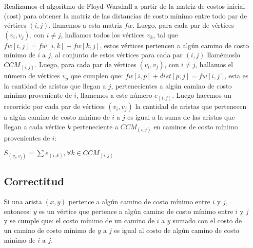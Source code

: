 \documentclass[article]{llncs}
\begin{document}
Realizamos el algoritmo de Floyd-Warshall a partir de la matriz de costos inicial (cost) para obtener la matriz de las distancias de costo mínimo entre todo par de vértices $(i,j)$, llamemos a esta matriz $fw$.
Luego, para cada par de vértices $(v_i,v_j)$, con $i \neq j$, hallamos todos los vértices $v_k$, tal que $fw[i,j] = fw[i,k] + fw[k,j]$, estos vértices pertencen a algún
camino de costo mínimo de $i$ a $j$, al conjunto de estos vértices para cada par $(i,j)$ llamémoslo $CCM_(i,j)$. Luego, para cada par de vértices $(v_i,v_j)$, con $i \neq j$, hallamos el número de vértices $v_p$ que cumplen que:
$fw[i,p] + dist[p,j] = fw[i,j]$, esta es la cantidad de aristas que llegan a $j$, pertenecientes a algún camino de costo mínimo proveniente de $i$, llamemos a este número $e_(i,j)$.
Luego hacemos un recorrido por cada par de vértices $(v_i,v_j)$ la cantidad de aristas que pertenecen a algún camino de costo mínimo de $i$ a $j$ es igual a la suma de las aristas que llegan a cada vértice $k$ perteneciente a $CCM_(i,j)$ en caminos de costo
mínimo provenientes de $i$:

$S_(v_i,v_j) = \sum e_(i,k), \forall k\in CCM_(i,j) $

\subsection{Correctitud}

Si una arista $(x,y)$ pertence a algún camino de costo mínimo entre $i$ y $j$, entonces: $y$ es un vértice que pertence a algún camino de costo mínimo entre $i$ y $j$ y se cumple que: 
el costo mínimo de un camino de $i$ a $y$ sumado con el costo de un camino de costo mínimo de $y$ a $j$ es igual al costo de algún camino de costo mínimo de $i$ a $j$. 
\end{document}
